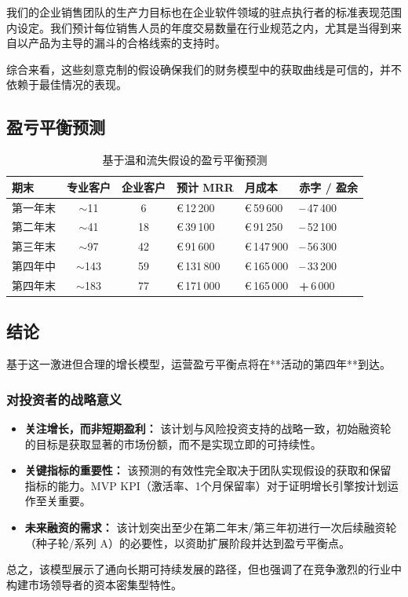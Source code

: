 \documentclass[11pt, a4paper, oneside]{article}
\begin{document}
我们的企业销售团队的生产力目标也在企业软件领域的驻点执行者的标准表现范围内设定。我们预计每位销售人员的年度交易数量在行业规范之内，尤其是当得到来自以产品为主导的漏斗的合格线索的支持时。

综合来看，这些刻意克制的假设确保我们的财务模型中的获取曲线是可信的，并不依赖于最佳情况的表现。

\subsection{盈亏平衡预测}

\begin{table}[H]
\centering
\caption{基于温和流失假设的盈亏平衡预测}
\label{tab:break_even_moderate_churn}
\begin{tabularx}{\textwidth}{@{}l c c >{\raggedleft\arraybackslash}X
                                    >{\raggedleft\arraybackslash}X
                                    >{\raggedleft\arraybackslash}X@{}}
\toprule
\textbf{期末} &
\textbf{专业客户} &
\textbf{企业客户} &
\textbf{预计 MRR} &
\textbf{月成本} &
\textbf{赤字 / 盈余} \\
\midrule
第一年末  & $\sim$11  & 6  & \euro{}\,12\,200  & \euro{}\,59\,600  & \textbf{–}\,47\,400 \\
第二年末  & $\sim$41  & 18 & \euro{}\,39\,100  & \euro{}\,91\,250  & \textbf{–}\,52\,100 \\
第三年末  & $\sim$97  & 42 & \euro{}\,91\,600  & \euro{}\,147\,900 & \textbf{–}\,56\,300 \\
第四年中  & $\sim$143 & 59 & \euro{}\,131\,800 & \euro{}\,165\,000 & \textbf{–}\,33\,200 \\
第四年末  & $\sim$183 & 77 & \euro{}\,171\,000 & \euro{}\,165\,000 & \textbf{+}\,6\,000  \\
\bottomrule
\end{tabularx}
\end{table}

\subsection{结论}
基于这一激进但合理的增长模型，运营盈亏平衡点将在**活动的第四年**到达。

\subsubsection*{对投资者的战略意义}
\begin{itemize}
    \item \textbf{关注增长，而非短期盈利：} 该计划与风险投资支持的战略一致，初始融资轮的目标是获取显著的市场份额，而不是实现立即的可持续性。
    \item \textbf{关键指标的重要性：} 该预测的有效性完全取决于团队实现假设的获取和保留指标的能力。MVP KPI（激活率、1个月保留率）对于证明增长引擎按计划运作至关重要。
    \item \textbf{未来融资的需求：} 该计划突出至少在第二年末/第三年初进行一次后续融资轮（种子轮/系列 A）的必要性，以资助扩展阶段并达到盈亏平衡点。
\end{itemize}
总之，该模型展示了通向长期可持续发展的路径，但也强调了在竞争激烈的行业中构建市场领导者的资本密集型特性。
\end{document}
